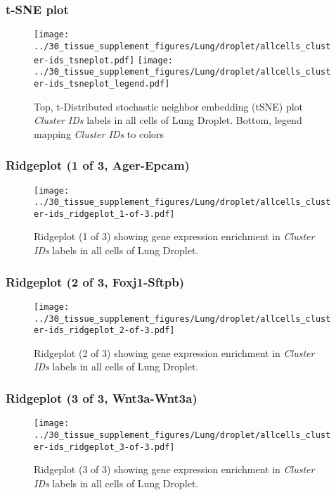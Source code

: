\clearpage
\subsubsection{t-SNE plot}
\begin{figure}[h]
\centering
\texttt{[image: ../30\_tissue\_supplement\_figures/Lung/droplet/allcells\_cluster-ids\_tsneplot.pdf]}
\texttt{[image: ../30\_tissue\_supplement\_figures/Lung/droplet/allcells\_cluster-ids\_tsneplot\_legend.pdf]}
\caption{Top, t-Distributed stochastic neighbor embedding (tSNE) plot  \emph{Cluster IDs} labels in all cells of Lung Droplet. Bottom, legend mapping \emph{Cluster IDs} to colors}
\end{figure}


\clearpage

\subsubsection{Ridgeplot (1 of 3, Ager-Epcam)}
\begin{figure}[h]
\centering
\texttt{[image: ../30\_tissue\_supplement\_figures/Lung/droplet/allcells\_cluster-ids\_ridgeplot\_1-of-3.pdf]}

\caption{ Ridgeplot (1 of 3)  showing gene expression enrichment in \emph{Cluster IDs} labels in all cells of Lung Droplet. }
\end{figure}


\clearpage

\subsubsection{Ridgeplot (2 of 3, Foxj1-Sftpb)}
\begin{figure}[h]
\centering
\texttt{[image: ../30\_tissue\_supplement\_figures/Lung/droplet/allcells\_cluster-ids\_ridgeplot\_2-of-3.pdf]}

\caption{ Ridgeplot (2 of 3)  showing gene expression enrichment in \emph{Cluster IDs} labels in all cells of Lung Droplet. }
\end{figure}


\clearpage

\subsubsection{Ridgeplot (3 of 3, Wnt3a-Wnt3a)}
\begin{figure}[h]
\centering
\texttt{[image: ../30\_tissue\_supplement\_figures/Lung/droplet/allcells\_cluster-ids\_ridgeplot\_3-of-3.pdf]}

\caption{ Ridgeplot (3 of 3)  showing gene expression enrichment in \emph{Cluster IDs} labels in all cells of Lung Droplet. }
\end{figure}


